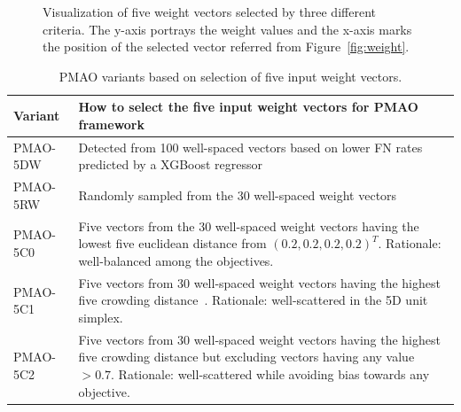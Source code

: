 \documentclass[a4paper,fleqn, review]{cas-dc}
\begin{document}
\begin{figure}[pos=!htbp, align=\centering, width=17cm]
	
	\caption{Visualization of five weight vectors selected by three different criteria. The y-axis portrays the weight values and the x-axis marks the position of the selected vector referred from Figure~\ref{fig:weight}. }
	\label{fig:simple-weight}
\end{figure}

\begin{table}[!htbp]
	\small
	\caption{PMAO variants based on selection of five input weight vectors.}
	\begin{tabular}{l|L{14cm}}
		Variant &  How to select the five input weight vectors for PMAO framework\\
		\hline
		PMAO-5DW  &  Detected from 100 well-spaced vectors based on lower FN rates predicted by a XGBoost regressor\\
		\hline
		PMAO-5RW  &  Randomly sampled from the 30 well-spaced weight vectors \\
		\hline
		PMAO-5C0  &  Five vectors from the 30 well-spaced weight vectors having the lowest five euclidean distance from $(0.2,0.2,0.2,0.2)^T$. Rationale: well-balanced among the objectives. \\
		\hline
		PMAO-5C1  &  Five vectors from 30 well-spaced weight vectors having the highest five crowding distance~\cite{deb2002fast}. Rationale: well-scattered in the 5D unit simplex. \\
		\hline
		PMAO-5C2  &  Five vectors from 30 well-spaced weight vectors having the highest five crowding distance but excluding vectors having any value $> 0.7$. Rationale: well-scattered while avoiding bias towards any objective.\\
	\end{tabular}\label{tab:variants-weight}
\end{table}
\end{document}
